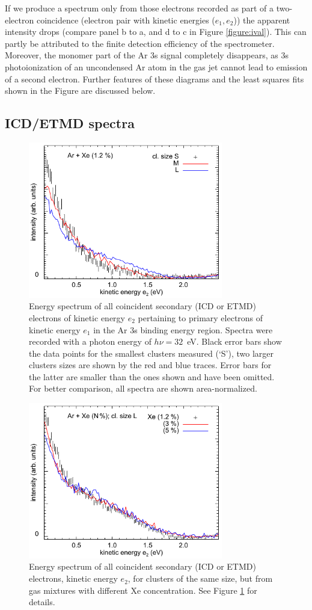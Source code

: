 If we produce a spectrum only from those electrons recorded as part of a two-electron coincidence (electron pair with kinetic energies ($e_1,e_2$)) the apparent intensity drops (compare panel b to a, and d to c in Figure \ref{figure:ival}).
This can partly be attributed to the finite detection efficiency of the spectrometer. 
Moreover, the monomer part of the Ar 3s signal completely disappears, as 3s photoionization of an uncondensed Ar atom in the gas jet cannot lead to emission of a second electron. 
Further features of these diagrams and the least squares fits shown in the Figure are discussed below.
%
%
\subsection{ICD/ETMD spectra}
%
\begin{figure}[ht]
 \centering
 \includegraphics[width=8.5cm]{pics/figure_icd_12.pdf}
 \caption{
Energy spectrum of all coincident secondary (ICD or ETMD) electrons of kinetic energy $e_2$ pertaining to primary electrons of kinetic energy $e_1$ in the Ar 3s binding energy region. 
Spectra were recorded with a photon energy of $h\nu = 32$~eV. 
Black error bars show the data points for the smallest clusters measured (`S'), two larger clusters sizes are shown by the red and blue traces. 
Error bars for the latter are smaller than the ones shown and have been omitted.
For better comparison, all spectra are shown area-normalized. 
}
 \label{figure:icd_12}
\end{figure}
%
%
\begin{figure}[ht]
 \centering
 \includegraphics[width=8.5cm]{pics/figure_icd_l.pdf}
 \caption{
Energy spectrum of all coincident secondary (ICD or ETMD) electrons, kinetic energy $e_2$, for clusters of the same size, but from gas mixtures with different Xe concentration. See Figure \protect\ref{figure:icd_12} for details.
}
 \label{figure:icd_l}
\end{figure}
